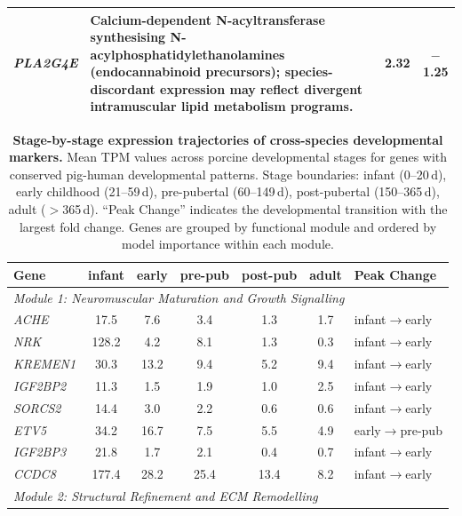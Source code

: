 \begin{landscape}
\begin{table}[p]
\begin{tabularx}{\linewidth}{lXcc}
    \textit{PLA2G4E} & Calcium-dependent N-acyltransferase synthesising N-acylphosphatidylethanolamines (endocannabinoid precursors); species-discordant expression may reflect divergent intramuscular lipid metabolism programs. & 2.32 & $-$1.25 \\
    \bottomrule
  \end{tabularx}
\end{table}
\end{landscape}


\begin{table}[H]
  \centering
  \caption{\textbf{Stage-by-stage expression trajectories of cross-species developmental markers.} Mean TPM values across porcine developmental stages for genes with conserved pig-human developmental patterns. Stage boundaries: infant (0--20\,d), early childhood (21--59\,d), pre-pubertal (60--149\,d), post-pubertal (150--365\,d), adult ($>$365\,d). ``Peak Change'' indicates the developmental transition with the largest fold change. Genes are grouped by functional module and ordered by model importance within each module.}
  \label{tab:S4}
  \footnotesize
  \begin{tabular}{lcccccl}
    \toprule
    Gene & infant & early & pre-pub & post-pub & adult & Peak Change \\
    \midrule
    \multicolumn{7}{l}{\textit{Module 1: Neuromuscular Maturation and Growth Signalling}} \\
    \textit{ACHE} & 17.5 & 7.6 & 3.4 & 1.3 & 1.7 & infant$\to$early \\
    \textit{NRK} & 128.2 & 4.2 & 8.1 & 1.3 & 0.3 & infant$\to$early \\
    \textit{KREMEN1} & 30.3 & 13.2 & 9.4 & 5.2 & 9.4 & infant$\to$early \\
    \textit{IGF2BP2} & 11.3 & 1.5 & 1.9 & 1.0 & 2.5 & infant$\to$early \\
    \textit{SORCS2} & 14.4 & 3.0 & 2.2 & 0.6 & 0.6 & infant$\to$early \\
    \textit{ETV5} & 34.2 & 16.7 & 7.5 & 5.5 & 4.9 & early$\to$pre-pub \\
    \textit{IGF2BP3} & 21.8 & 1.7 & 2.1 & 0.4 & 0.7 & infant$\to$early \\
    \textit{CCDC8} & 177.4 & 28.2 & 25.4 & 13.4 & 8.2 & infant$\to$early \\
    \midrule
    \multicolumn{7}{l}{\textit{Module 2: Structural Refinement and ECM Remodelling}} \\

\end{tabular}
\end{table}
